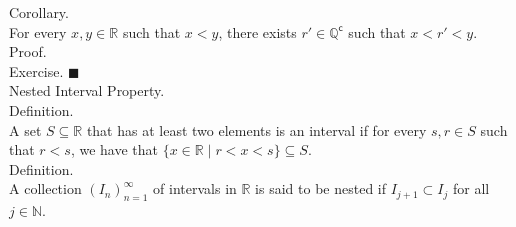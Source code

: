 \documentclass[twocolumn]{article}
\newcommand{\qed}{$\blacksquare$}
\newcommand{\COMPLEMENT}{^\mathsf{c}}
\let\complement\COMPLEMENT
\newcommand{\naturals}{\mathbb{N}}
\newcommand{\rationals}{\mathbb{Q}}
\newcommand{\irrationals}{\rationals\complement}
\newcommand{\reals}{\mathbb{R}}
\begin{document}
Corollary. \\
For every $x, y \in \reals$ such that $x < y$, there exists $r' \in \irrationals$ such that $x < r' < y$. \\
Proof. \\
Exercise. \qed \\

Nested Interval Property. \\

Definition. \\
A set $S \subseteq \reals$ that has at least two elements is an interval if for every $s, r \in S$ such that $r < s$, we have that $\{ x \in \reals \mid r < x < s \} \subseteq S$. \\

Definition. \\
A collection $(I_n)_{n = 1}^\infty$ of intervals in $\reals$ is said to be nested if $I_{j + 1} \subset I_j$ for all $j \in \naturals$. \\
\end{document}
